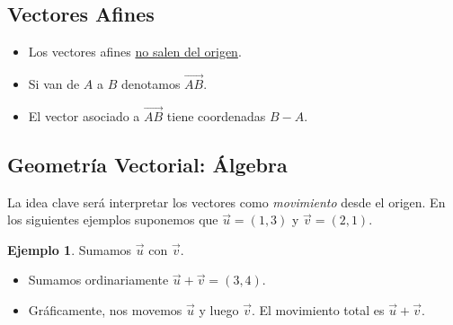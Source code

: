 \documentclass[12pt]{article}
\theoremstyle{plain}
\theoremstyle{definition}
\newtheorem{Ex}[Th]{Ejemplo}           %
\theoremstyle{remark}
\renewcommand{\:}{\colon}           %
\newcommand{\un}[1]{\underline{#1}}
\renewcommand{\.}{\Cdot}                %
\begin{document}
\begin{multicols}{2}
\subsection*{Vectores Afines}
\vspace{-0.35em}
\begin{itemize}
  \itemsep=-0.35em
  \item Los vectores afines \un{no salen del origen}.
  \item Si van de $A$ a $B$ denotamos $\overrightarrow{AB}$.
  \item El vector asociado a $\overrightarrow{AB}$ tiene coordenadas $B-A$.
\end{itemize}
\vspace{-1em}
\subsection*{Geometría Vectorial: Álgebra}

La idea clave será interpretar los vectores como \emph{movimiento} desde el origen. En los siguientes ejemplos suponemos que $\vec u =(1,3)$ y $\vec v = (2,1)$.
\vspace{-0.7em}
\begin{Ex}
  Sumamos $\vec u$ con $\vec v$.\vspace{-0.35em}
  \begin{itemize}
    \itemsep=-0.35em
    \item Sumamos ordinariamente $\vec u+\vec v=(3,4)$.
    \item Gráficamente, nos movemos $\vec u$ y luego $\vec v$. El movimiento total es $\vec u + \vec v$.
  
  \end{itemize} 
\begin{center}

  \begin{tikzpicture}[x=0.75pt,y=0.75pt,yscale=-1,xscale=1]
    

\end{tikzpicture}
\end{center}
\end{Ex}
\end{multicols}
\end{document}
